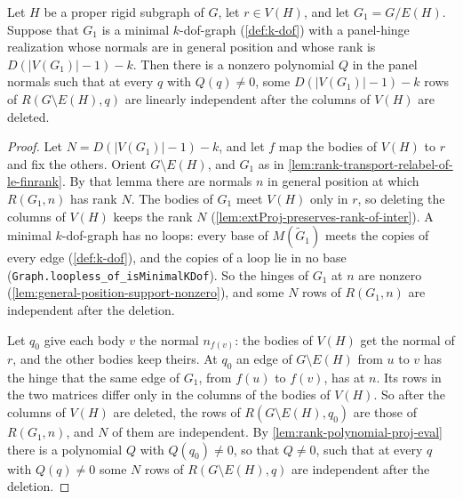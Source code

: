 \begin{lemma}
  \label{lem:rank-polynomial-IH-relabel-proj}
  \leanok
  Let $H$ be a proper rigid subgraph of $G$, let $r \in V(H)$, and let
  $G_1 = G/E(H)$. Suppose that $G_1$ is a minimal $k$-dof-graph
  (\cref{def:k-dof}) with a panel-hinge realization whose normals are in
  general position and whose rank is $D(|V(G_1)|-1) - k$. Then there is a nonzero polynomial $Q$ in the
  panel normals such that at every $q$ with $Q(q) \neq 0$, some
  $D(|V(G_1)|-1) - k$ rows of $R(G \setminus E(H), q)$ are linearly
  independent after the columns of $V(H)$ are deleted.
\end{lemma}
\begin{proof}
  \leanok
  Let $N = D(|V(G_1)|-1) - k$, and let $f$ map the bodies of $V(H)$ to
  $r$ and fix the others. Orient $G \setminus E(H)$, and $G_1$ as in
  \cref{lem:rank-transport-relabel-of-le-finrank}. By that lemma there are
  normals $n$ in general position at which $R(G_1, n)$ has rank $N$. The
  bodies of $G_1$ meet $V(H)$ only in $r$, so deleting the columns of
  $V(H)$ keeps the rank $N$ (\cref{lem:extProj-preserves-rank-of-inter}).
  A minimal $k$-dof-graph has no loops: every base of $M(\tilde G_1)$
  meets the copies of every edge (\cref{def:k-dof}), and the copies of a
  loop lie in no base
  (\texttt{Graph.\allowbreak{}loopless\_\allowbreak{}of\_\allowbreak{}isMinimalKDof}).
  So the hinges of $G_1$ at $n$ are nonzero
  (\cref{lem:general-position-support-nonzero}), and some $N$ rows of
  $R(G_1, n)$ are independent after the deletion.

  Let $q_0$ give each body $v$ the normal $n_{f(v)}$: the bodies of
  $V(H)$ get the normal of $r$, and the other bodies keep theirs. At
  $q_0$ an edge of $G \setminus E(H)$ from $u$ to $v$ has the hinge that
  the same edge of $G_1$, from $f(u)$ to $f(v)$, has at $n$. Its rows
  in the two matrices differ only in the columns of the bodies of $V(H)$.
  So after the columns of $V(H)$ are deleted, the rows of
  $R(G \setminus E(H), q_0)$ are those of $R(G_1, n)$, and $N$ of them
  are independent. By \cref{lem:rank-polynomial-proj-eval} there is a
  polynomial $Q$ with $Q(q_0) \neq 0$, so that $Q \neq 0$, such that at
  every $q$ with $Q(q) \neq 0$ some $N$ rows of
  $R(G \setminus E(H), q)$ are independent after the deletion.
\end{proof}

